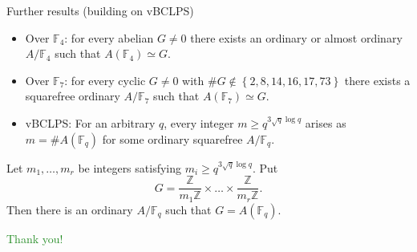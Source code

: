 \documentclass[usenames,dvipsnames]{beamer}
\def\Z{\mathbb{Z}}
\def\F{\mathbb{F}}
\newcommand{\set}[1]{\left\lbrace#1\right\rbrace }
\newcommand{\green}[1]{\textcolor{ForestGreen}{#1}}
\begin{document}
\begin{frame}{ Further results (building on vBCLPS) }
	\begin{itemize}
        \pause
        \item Over $\F_4$: for every abelian $G\neq 0$ there exists an ordinary or almost ordinary $A/\F_4$ such that $A(\F_4)\simeq G$.
        \pause
        \item Over $\F_7$: for every cyclic $G\neq 0$ with $\# G\not \in \set{2,8,14,16,17,73}$ there exists a squarefree ordinary $A/\F_7$ such that $A(\F_7)\simeq G$.
        \pause
        \item vBCLPS: For an arbitrary $q$, every integer $m\geq q^{3\sqrt{q}\log q}$ arises as $m=\#A(\F_q)$ for some ordinary squarefree $A/\F_q$.
	\end{itemize}
    \pause
    \begin{theorem}[M.-Springer]
        Let $m_1,\ldots,m_r$ be integers satisfying $m_i\geq q^{3\sqrt{q}\log q}$.
        Put
        \[ G=\frac{\Z}{m_1 \Z}\times \ldots \times \frac{\Z}{m_r \Z}. \]
        \pause
        Then there is an ordinary $A/\F_q$ such that $G=A(\F_q)$.
    \end{theorem}
\end{frame}

\begin{frame}{ }
    \begin{center}
        \green{\huge Thank you!}
    \end{center}
\end{frame}
\end{document}
